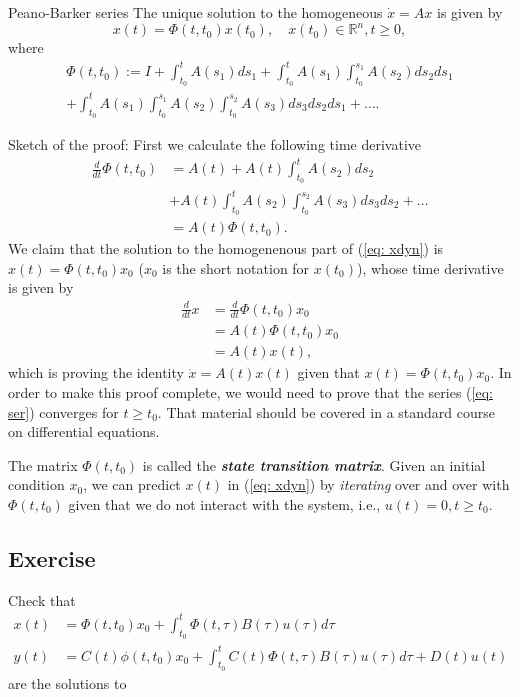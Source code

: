 \begin{theorem}{Peano-Barker series}
The unique solution to the homogeneous $\dot x = Ax$ is given by
	\begin{equation}
		x(t) = \Phi(t,t_0)x(t_0), \quad x(t_0)\in\mathbb{R}^n, t\geq 0,
	\end{equation}
where
	\begin{align}
		\Phi(t,t_0) := I + \int_{t_0}^t A(s_1)ds_1 + \int_{t_0}^t A(s_1) \int_{t_0}^{s_1} A(s_2)ds_2ds_1 \nonumber \\ + \int_{t_0}^t A(s_1) \int_{t_0}^{s_1} A(s_2)\int_{t_0}^{s_2} A(s_3) ds_3ds_2ds_1 + \dots . \label{eq: ser}
	\end{align}
\end{theorem}
Sketch of the proof:
First we calculate the following time derivative
	\begin{align}
		\frac{d}{dt}\Phi(t,t_0) &= A(t) + A(t)\int_{t_0}^{t}A(s_2)ds_2 \nonumber \\ &+ A(t)\int_{t_0}^t A(s_2) \int_{t_0}^{s_2} A(s_3)ds_3ds_2 + \dots \nonumber \\
		&= A(t) \Phi(t,t_0).
	\end{align}
We claim that the solution to the homogenenous part of (\ref{eq: xdyn}) is $x(t) = \Phi(t,t_0)x_0$ ($x_0$ is the short notation for $x(t_0)$), whose time derivative is given by
\begin{align}
	\frac{d}{dt} x &= \frac{d}{dt}\Phi(t,t_0)x_0 \nonumber \\
	&= A(t) \Phi(t,t_0) x_0 \nonumber \\
	&= A(t)x(t),
\end{align}
which is proving the identity $\dot x = A(t)x(t)$ given that $x(t) = \Phi(t,t_0)x_0$. In order to make this proof complete, we would need to prove that the series (\ref{eq: ser}) converges for $t\geq t_0$. That material should be covered in a standard course on differential equations.

The matrix $\Phi(t,t_0)$ is called the \textbf{\emph{state transition matrix}}. Given an initial condition $x_0$, we can predict $x(t)$ in (\ref{eq: xdyn}) by \emph{iterating} over and over with $\Phi(t,t_0)$ given that we do not interact with the system, i.e., $u(t) = 0, t\geq t_0$.

\subsection{Exercise}
Check that 
\begin{align}
	x(t) &= \Phi(t,t_0)x_0 + \int_{t_0}^t \Phi(t,\tau)B(\tau)u(\tau)d\tau \nonumber \\
	y(t) &= C(t)\phi(t,t_0)x_0 + \int_{t_0}^t C(t)\Phi(t,\tau)B(\tau)u(\tau)d\tau + D(t)u(t) \nonumber
\end{align}
are the solutions to


